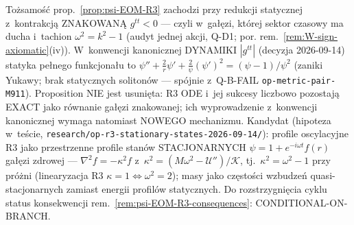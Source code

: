 \begin{remark}%
\label{rem:psi-EOM-R3-branch-status}
To\.zsamo\'s\'c prop.~\ref{prop:psi-EOM-R3} zachodzi przy redukcji
statycznej z~kontrakcj\k{a} ZNAKOWAN\k{A} $g^{tt}<0$ --- czyli
w~ga\l{}\k{e}zi, kt\'orej sektor czasowy ma ducha i~tachion
$\omega^2=k^2-1$ (audyt jednej akcji, Q-D1; por.
rem.~\ref{rem:W-sign-axiomatic}(iv)). W~konwencji kanonicznej
DYNAMIKI $|g^{tt}|$ (decyzja 2026-09-14) statyka pe\l{}nego
funkcjona\l{}u to $\psi''+\tfrac{2}{r}\psi'+\tfrac{2}{\psi}(\psi')^2
=(\psi-1)/\psi^2$ (zaniki Yukawy; brak statycznych soliton\'ow ---
sp\'ojnie z~Q-B-FAIL \texttt{op-metric-pair-M911}). Proposition
NIE jest usuni\k{e}ta: R3 ODE i~jej sukcesy liczbowo pozostaj\k{a}
EXACT jako r\'ownanie ga\l{}\k{e}zi znakowanej; ich wyprowadzenie
z~konwencji kanonicznej wymaga natomiast NOWEGO mechanizmu.
Kandydat (hipoteza w~te\'scie,
\texttt{research/op-r3-stationary-states-2026-09-14/}): profile
oscylacyjne R3 jako przestrzenne profile stan\'ow STACJONARNYCH
$\psi=1+e^{-i\omega t}f(r)$ ga\l{}\k{e}zi zdrowej ---
$\nabla^2 f=-\kappa^2 f$ z~$\kappa^2=(M\omega^2-\mathcal{U}'')/
\mathcal{K}$, tj.\ $\kappa^2=\omega^2-1$ przy pr\'o\.zni
(linearyzacja R3 $\kappa=1\Leftrightarrow\omega^2=2$); masy
jako cz\k{e}sto\'sci wzbudze\'n quasi-stacjonarnych zamiast energii
profil\'ow statycznych. Do rozstrzygni\k{e}cia cyklu status
konsekwencji rem.~\ref{rem:psi-EOM-R3-consequences}:
CONDITIONAL-ON-BRANCH.


\end{remark}
